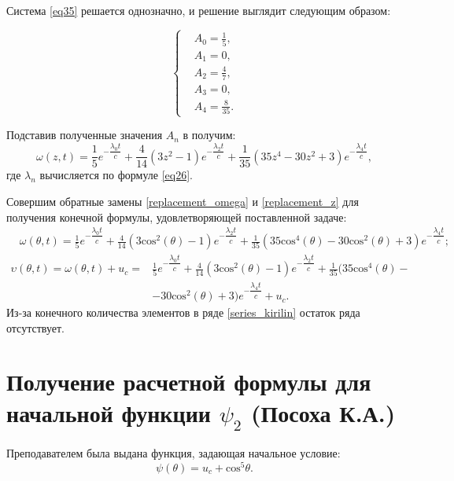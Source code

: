 {    Система \eqref{eq35} решается однозначно, и решение выглядит следующим образом:
    
    \begin{equation}
    \left\{
    \begin{split}
     &A_0 = \frac{1}{5}, \\
     &A_1 = 0, \\
     &A_2 = \frac{4}{7}, \\
     &A_3 = 0, \\
     &A_4 = \frac{8}{35}.
    \end{split}
    \right.
    \end{equation} 
    
    Подставив полученные значения $A_n$ в  получим:
    \begin{equation}
        \omega(z,t) = \frac{1}{5}e^{- \dfrac{\lambda_0 t}{c}} + \frac{4}{14}(3z^2-1)e^{- \dfrac{\lambda_2 t}{c}} + 
        \frac{1}{35}(35z^4-30z^2+3)e^{- \dfrac{\lambda_4 t}{c}},
    \end{equation}
    где $\lambda_n$ вычисляется по формуле \eqref{eq26}.
    
    Совершим обратные замены \eqref{replacement_omega} и \eqref{replacement_z} для получения конечной формулы, удовлетворяющей поставленной задаче:
    \begin{align*}
       &\omega(\theta,t) =  
        \frac{1}{5}e^{- \dfrac{\lambda_0 t}{c}} + \frac{4}{14}(3\text{cos}^2(\theta)-1)e^{- \dfrac{\lambda_2 t}{c}} + 
        \frac{1}{35}(35\text{cos}^4(\theta)-30\text{cos}^2(\theta)+3)e^{- \dfrac{\lambda_4 t}{c}};
    \end{align*}
    \begin{align}\label{series_kirilin}
    \upsilon(\theta, t) = \omega(\theta, t) + u_c = 
         &\frac{1}{5}e^{- \dfrac{\lambda_0 t}{c}} + \frac{4}{14}(3\text{cos}^2(\theta)-1)e^{- \dfrac{\lambda_2 t}{c}} 
        + \frac{1}{35}(35\text{cos}^4(\theta) - \nonumber\\
        &-30\text{cos}^2(\theta)+3)e^{- \dfrac{\lambda_4 t}{c}} + u_c.
    \end{align}
    Из-за конечного количества элементов в ряде \eqref{series_kirilin} остаток ряда отсутствует.


\newpage
\section{Получение расчетной формулы для начальной функции \texorpdfstring{$\psi_2$}{TEXT} (Посоха К.А.)}
{
Преподавателем была выдана функция, задающая начальное условие:
    \begin{equation}
        \psi(\theta) = u_c + \text{cos}^5\theta.     
    \end{equation}
    
}}

